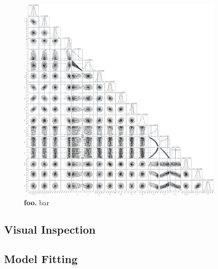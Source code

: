 \documentclass[12pt,twocolumn,tighten]{aastex62}
\begin{document}
\begin{figure}[t]
	\begin{center}
		\leavevmode
		\includegraphics[width=0.9\textwidth]{f5_comp.png}
	\end{center}
	\vspace{-0.7cm}
	\caption{ {\bf foo.}
    bar
		\label{fig:corner}
	}
\end{figure}


\subsection{Visual Inspection}

% 

\subsection{Model Fitting}
\end{document}
